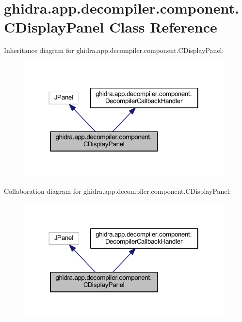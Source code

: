 \hypertarget{classghidra_1_1app_1_1decompiler_1_1component_1_1_c_display_panel}{}\section{ghidra.\+app.\+decompiler.\+component.\+C\+Display\+Panel Class Reference}
\label{classghidra_1_1app_1_1decompiler_1_1component_1_1_c_display_panel}


Inheritance diagram for ghidra.\+app.\+decompiler.\+component.\+C\+Display\+Panel\+:
\nopagebreak
\begin{figure}[H]
\begin{center}
\leavevmode
\includegraphics[width=310pt]{classghidra_1_1app_1_1decompiler_1_1component_1_1_c_display_panel__inherit__graph}
\end{center}
\end{figure}


Collaboration diagram for ghidra.\+app.\+decompiler.\+component.\+C\+Display\+Panel\+:
\nopagebreak
\begin{figure}[H]
\begin{center}
\leavevmode
\includegraphics[width=310pt]{classghidra_1_1app_1_1decompiler_1_1component_1_1_c_display_panel__coll__graph}
\end{center}
\end{figure}

